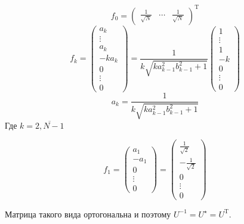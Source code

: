 \begin{lemma}
\begin{minipage}{0.9\textwidth}
            \[f_0 = \begin{pmatrix} \frac{1}{\sqrt N} & \cdots & \frac{1}{\sqrt N} \end{pmatrix}^{\mathrm{T}}\]
                \providecommand{\fknorm}{\sqrt{k a_{k-1}^2 b_{k-1}^2 + 1}}
            \[
                f_k =
            \begin{pmatrix}a_k \\ \vdots \\ a_k \\ -ka_k \\ 0 \\ \vdots \\ 0 \end{pmatrix} =
                \frac{1}{k\fknorm}
            \begin{pmatrix}1 \\ \vdots \\ 1 \\ -k \\ 0 \\ \vdots \\ 0 \end{pmatrix}
                \]
            \[
                a_k = \frac{1}{k\fknorm}
            \]
        Где \( k=\overline{2,N-1} \)

            \[
                f_1
             = \begin{pmatrix}a_1 \\ -a_1 \\ 0 \\ \vdots \\ 0 \end{pmatrix}
                 = \begin{pmatrix}\frac1{\sqrt2} \\ - \frac{1}{\sqrt2} \\ 0 \\ \vdots \\ 0 \end{pmatrix}
                     \]

                 Матрица такого вида ортогональна и поэтому
            \( U^{-1} = U^\star = U^{\mathrm{T}} \).
        \end{minipage}
\end{lemma}
